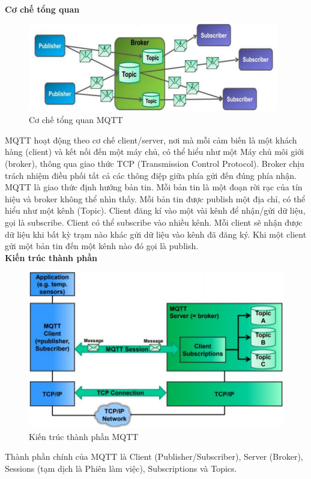 \indent \textbf{Cơ chế tổng quan}
\begin{figure}[H]
	\centering
	\includegraphics[scale=.7]{Chapter 2/image chapter 2/cochetongquanMQTT.png}
	\caption[Cơ chế tổng quan MQTT]{Cơ chế tổng quan MQTT}
	\label{hinh27}
\end{figure}
MQTT hoạt động theo cơ chế client/server, nơi mà mỗi cảm biến là một khách hàng (client) và kết nối đến một máy chủ, có thể hiểu như một Máy chủ môi giới (broker), thông qua giao thức TCP (Transmission Control Protocol). Broker chịu trách nhiệm điều phối tất cả các thông điệp giữa phía gửi đến đúng phía nhận.\\
\indent MQTT là giao thức định hướng bản tin. Mỗi bản tin là một đoạn rời rạc của tín hiệu và broker không thể nhìn thấy. Mỗi bản tin được publish một địa chỉ, có thể hiểu như một kênh (Topic). Client đăng kí vào một vài kênh để nhận/gửi dữ liệu, gọi là subscribe. Client có thể subscribe vào nhiều kênh. Mỗi client sẽ nhận được dữ liệu khi bất kỳ trạm nào khác gửi dữ liệu vào kênh đã đăng ký. Khi một client gửi một bản tin đến một kênh nào đó gọi là publish.\\
\indent \textbf{Kiến trúc thành phần}
\begin{figure}[H]
	\centering
	\includegraphics[scale=.7]{Chapter 2/image chapter 2/kientrucMQTT.png}
	\caption[Kiến trúc thành phần MQTT]{Kiến trúc thành phần MQTT}
	\label{hinh28}
\end{figure}
Thành phần chính của MQTT là Client (Publisher/Subscriber), Server (Broker), Sessions (tạm dịch là Phiên làm việc), Subscriptions và Topics.\\
